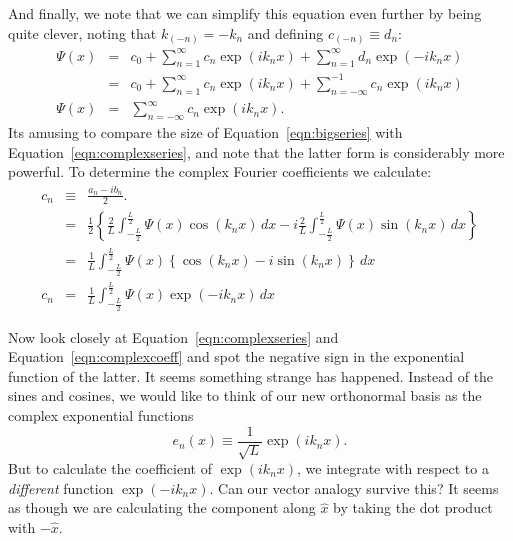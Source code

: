 \documentclass[12pt,oneside]{book}
\begin{document}
And finally, we note that we can simplify this equation even further by being quite clever, noting that 
$k_{(-n)} = -k_n$ and defining $c_{(-n)} \equiv d_n$:
\begin{eqnarray}
\Psi(x)  &=& c_0 + \sum_{n=1}^{\infty}  c_n \exp(i k_n x) + \sum_{n=1}^{\infty}  d_n \exp(-i k_n x) \nonumber \\
 &=& c_0 + \sum_{n=1}^{\infty}  c_n \exp(i k_n x) + \sum_{n=-\infty}^{-1}  c_n \exp(i k_n x) \nonumber \\
\Psi(x) &=& \sum_{n=-\infty}^{\infty} c_n \exp(i k_n x). \label{eqn:complexseries}
\end{eqnarray}
Its amusing to compare the size of Equation~\ref{eqn:bigseries} with Equation~\ref{eqn:complexseries}, and note that the latter form is considerably more powerful.  To determine the complex Fourier coefficients we calculate:
\begin{eqnarray}
c_n &\equiv& \frac{a_n - i b_n}{2}. \nonumber \\
&=& \frac{1}{2} \left\{ 
\frac{2}{L} \int_{-\frac{L}{2}}^{\frac{L}{2}}  \Psi(x) \cos( k_n x) \, dx
-i \frac{2}{L} \int_{-\frac{L}{2}}^{\frac{L}{2}}  \Psi(x) \sin( k_n x) \, dx
\right\} \nonumber \\
&=& \frac{1}{L} \int_{-\frac{L}{2}}^{\frac{L}{2}}  \Psi(x) \left\{\cos( k_n x) - i \sin( k_n x) \right\} \, dx \nonumber \\
c_n &=& \frac{1}{L} \int_{-\frac{L}{2}}^{\frac{L}{2}}  \Psi(x) \exp(-i k_n x) \, dx \label{eqn:complexcoeff}
\end{eqnarray}

Now look closely at Equation~\ref{eqn:complexseries} and Equation~\ref{eqn:complexcoeff} and spot the negative sign in the exponential function of the latter.  It seems something strange has happened.  Instead of the sines and cosines, we would like to think of our new orthonormal basis as the complex exponential functions 
\begin{equation}
e_n(x) \equiv \frac{1}{\sqrt{L}}\exp(i k_n x).  
\end{equation}
But to calculate the coefficient of $\exp(i k_n x)$, we integrate with respect to a {\em different} function $\exp(-i k_n x)$.  Can our vector analogy survive this?  It seems as though we are calculating the component along $\hat{x}$ by taking the dot product with $-\hat{x}$.   
\end{document}
